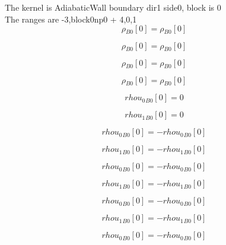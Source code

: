 \documentclass{article}
\begin{document}
\noindent The kernel is AdiabaticWall boundary dir1 side0, block is 0\\\noindent The ranges are -3,block0np0 + 4,0,1\\\begin{dmath}{\rho{_{B0}}}[{0}] = {\rho{_{B0}}}[{0}]\end{dmath}

\begin{dmath}{\rho{_{B0}}}[{0}] = {\rho{_{B0}}}[{0}]\end{dmath}

\begin{dmath}{\rho{_{B0}}}[{0}] = {\rho{_{B0}}}[{0}]\end{dmath}

\begin{dmath}{\rho{_{B0}}}[{0}] = {\rho{_{B0}}}[{0}]\end{dmath}

\begin{dmath}{rhou_{0}{_{B0}}}[{0}] = 0\end{dmath}

\begin{dmath}{rhou_{1}{_{B0}}}[{0}] = 0\end{dmath}

\begin{dmath}{rhou_{0}{_{B0}}}[{0}] = - {rhou_{0}{_{B0}}}[{0}]\end{dmath}

\begin{dmath}{rhou_{1}{_{B0}}}[{0}] = - {rhou_{1}{_{B0}}}[{0}]\end{dmath}

\begin{dmath}{rhou_{0}{_{B0}}}[{0}] = - {rhou_{0}{_{B0}}}[{0}]\end{dmath}

\begin{dmath}{rhou_{1}{_{B0}}}[{0}] = - {rhou_{1}{_{B0}}}[{0}]\end{dmath}

\begin{dmath}{rhou_{0}{_{B0}}}[{0}] = - {rhou_{0}{_{B0}}}[{0}]\end{dmath}

\begin{dmath}{rhou_{1}{_{B0}}}[{0}] = - {rhou_{1}{_{B0}}}[{0}]\end{dmath}

\begin{dmath}{rhou_{0}{_{B0}}}[{0}] = - {rhou_{0}{_{B0}}}[{0}]\end{dmath}
\end{document}
